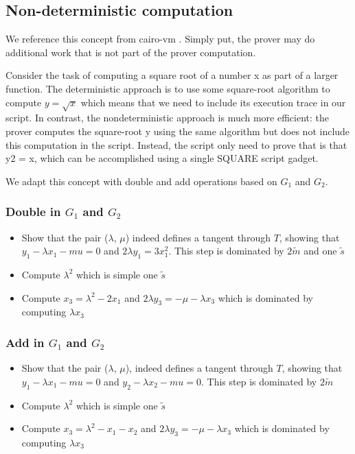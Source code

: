 \subsection{Non-deterministic computation}

We reference this concept from cairo-vm \cite{website:cairo-vm}. Simply put, the prover
may do additional work that is not part of the prover computation.

Consider the task of computing a square root of a number x as part of a larger function.
The deterministic approach is to use some square-root algorithm to compute $ y = \sqrt{x} $ which means that we need to
include its execution trace in our script. In contrast, the nondeterministic approach
is much more efficient: the prover computes the square-root y using the
same algorithm but does not include this computation in the script. Instead, the script only need to prove that is that y2 = x, which can be accomplished using a single SQUARE script gadget.

We adapt this concept with double and add operations based on $G_1$ and $G_2$.

\subsubsection{Double in $G_1$ and $G_2$}

\begin{itemize}
    \item Show that the pair ($\lambda$, $\mu$) indeed defines a tangent through $T$, showing that $\displaystyle y_1 - \lambda x_{1} - mu = 0$ 
    and $\displaystyle 2\lambda y_1 = 3x_1^2$. This step is dominated by $2\tilde{m}$ and one $\tilde{s}$
    \item Compute $\lambda^2$ which is simple one $\tilde{s}$
    \item Compute $\displaystyle x_3 = \lambda^2-2x_1$ and $\displaystyle 2\lambda y_3 = -\mu - \lambda x_3$ which is dominated by computing $\lambda x_3$
\end{itemize}

\subsubsection{Add in $G_1$ and $G_2$}

\begin{itemize}
    \item Show that the pair ($\lambda$, $\mu$), indeed defines a tangent through $T$, showing that $\displaystyle y_1 - \lambda x_{1} - mu = 0$ 
    and $\displaystyle y_2 - \lambda x_{2} - mu = 0$. This step is dominated by $2\tilde{m}$
    \item Compute $\lambda^2$ which is simple one $\tilde{s}$
    \item Compute $\displaystyle x_3 = \lambda^2-x_1-x_2$ and $\displaystyle 2\lambda y_3 = -\mu - \lambda x_3$ which is dominated by computing $\lambda x_3$
\end{itemize}
